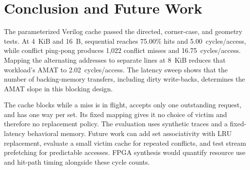 \documentclass[conference]{IEEEtran}
\begin{document}
\section{Conclusion and Future Work}
The parameterized Verilog cache passed the directed, corner-case, and geometry tests. At 4~KiB and 16~B, sequential reaches 75.00\% hits and 5.00~cycles/access, while conflict ping-pong produces 1,022 conflict misses and 16.75~cycles/access. Mapping the alternating addresses to separate lines at 8~KiB reduces that workload's AMAT to 2.02~cycles/access. The latency sweep shows that the number of backing-memory transfers, including dirty write-backs, determines the AMAT slope in this blocking design.

The cache blocks while a miss is in flight, accepts only one outstanding request, and has one way per set. Its fixed mapping gives it no choice of victim and therefore no replacement policy. The evaluation uses synthetic traces and a fixed-latency behavioral memory. Future work can add set associativity with LRU replacement, evaluate a small victim cache for repeated conflicts, and test stream prefetching for predictable accesses. FPGA synthesis would quantify resource use and hit-path timing alongside these cycle counts.



\end{document}
